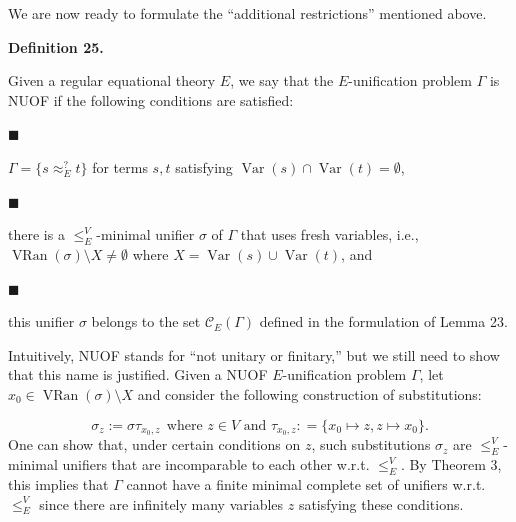  
 
We are now ready to formulate the “additional restrictions” mentioned above.\par
 
 
 
\par\medskip\noindent\textbf{Definition 25.}\par
 
 
Given a regular equational theory $E$, we say that the $E$-unification problem $\Gamma$ is NUOF if the following conditions are satisfied:\par
  
\par\noindent  $\blacksquare$ 
 
$\Gamma=\{s\approx_{E}^{?}t\}$ for terms $s,t$ satisfying $\operatorname{Var}(s)\cap\operatorname{Var}(t)=\emptyset$,\par
 
 
 
\par\noindent  $\blacksquare$ 
 
there is a $\leq_{E}^{V}$-minimal unifier $\sigma$ of $\Gamma$ that uses fresh variables, i.e., $\operatorname{VRan}(\sigma)\setminus X\neq\emptyset$ where $X=\operatorname{Var}(s)\cup\operatorname{Var}(t)$, and\par
 
 
 
\par\noindent  $\blacksquare$ 
 
this unifier $\sigma$ belongs to the set $\mathcal{C}_{E}(\Gamma)$ defined in the formulation of Lemma 23.\par
 
 
  
 
 
 
Intuitively, NUOF stands for “not unitary or finitary,” but we still need to show that this name is justified. Given a NUOF $E$-unification problem $\Gamma$, let $x_{0}\in\operatorname{VRan}(\sigma)\setminus X$ and consider the following construction of substitutions:\par
    \[\sigma_{z}:=\sigma\tau_{x_{0},z}\ \ \mbox{where $z\in{V}$ and $\tau_{x_{0},z}:%
=\{x_{0}\mapsto z,z\mapsto x_{0}\}$}.\]    
One can show that, under certain conditions on $z$, such substitutions $\sigma_{z}$ are $\leq_{E}^{V}$-minimal unifiers that are incomparable to each other w.r.t. $\leq_{E}^{V}$. By Theorem 3, this implies that $\Gamma$ cannot have a finite minimal complete set of unifiers w.r.t. $\leq_{E}^{V}$ since there are infinitely many variables $z$ satisfying these conditions.\par
 
